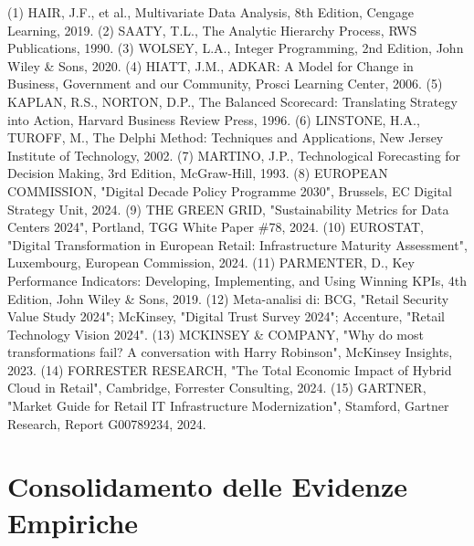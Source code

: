(1) HAIR, J.F., et al., Multivariate Data Analysis, 8th Edition, Cengage Learning, 2019.
(2) SAATY, T.L., The Analytic Hierarchy Process, RWS Publications, 1990.
(3) WOLSEY, L.A., Integer Programming, 2nd Edition, John Wiley \& Sons, 2020.
(4) HIATT, J.M., ADKAR: A Model for Change in Business, Government and our Community, Prosci Learning Center, 2006.
(5) KAPLAN, R.S., NORTON, D.P., The Balanced Scorecard: Translating Strategy into Action, Harvard Business Review Press, 1996.
(6) LINSTONE, H.A., TUROFF, M., The Delphi Method: Techniques and Applications, New Jersey Institute of Technology, 2002.
(7) MARTINO, J.P., Technological Forecasting for Decision Making, 3rd Edition, McGraw-Hill, 1993.
(8) EUROPEAN COMMISSION, "Digital Decade Policy Programme 2030", Brussels, EC Digital Strategy Unit, 2024.
(9) THE GREEN GRID, "Sustainability Metrics for Data Centers 2024", Portland, TGG White Paper \#78, 2024.
(10) EUROSTAT, "Digital Transformation in European Retail: Infrastructure Maturity Assessment", Luxembourg, European Commission, 2024.
(11) PARMENTER, D., Key Performance Indicators: Developing, Implementing, and Using Winning KPIs, 4th Edition, John Wiley \& Sons, 2019.
(12) Meta-analisi di: BCG, "Retail Security Value Study 2024"; McKinsey, "Digital Trust Survey 2024"; Accenture, "Retail Technology Vision 2024".
(13) MCKINSEY \& COMPANY, "Why do most transformations fail? A conversation with Harry Robinson", McKinsey Insights, 2023.
(14) FORRESTER RESEARCH, "The Total Economic Impact of Hybrid Cloud in Retail", Cambridge, Forrester Consulting, 2024.
(15) GARTNER, "Market Guide for Retail IT Infrastructure Modernization", Stamford, Gartner Research, Report G00789234, 2024.





































\section{Consolidamento delle Evidenze Empiriche}

